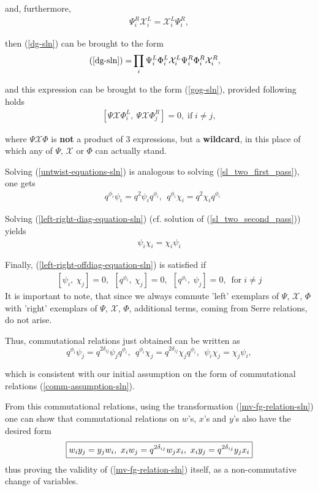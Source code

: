 \documentclass{article}
\newcommand{\lsb}{\left [}
\newcommand{\rsb}{\right ]}
\newcommand{\SB}[1]{\lsb #1 \rsb}
\newcommand{\be}{\begin{eqnarray}}
\newcommand{\ee}{\end{eqnarray}}
\DeclareMathOperator{\If}{if}
\DeclareMathOperator{\For}{for}
\newcommand {\?}{\textit{???}}
\def\Chi{\mathcal{X}}
\newcommand{\EChiL}[1][]{\Chi^L_{#1}}
\newcommand{\EChiR}[1][]{\Chi^R_{#1}}
\newcommand{\EPsiL}[1][]{\Psi^L_{#1}}
\newcommand{\EPsiR}[1][]{\Psi^R_{#1}}
\newcommand{\QPhiL}[1][]{\Phi^L_{#1}}
\newcommand{\QPhiR}[1][]{\Phi^R_{#1}}
\newcommand{\delabel}[1]{(\ref{#1})}
\begin{document}
and, furthermore,
\be
\label{left-right-diag-equation-sln}
\EPsiR[i] \EChiL[i] = \EChiL[i] \EPsiR[i],
\ee

then \delabel{dg-sln} can be brought to the form
\begin{align}
\delabel{dg-sln} = & \prod_i \EPsiL[i] \QPhiL[i] \EChiL[i] \EPsiR[i]  \QPhiR[i]  \EChiR[i],
\end{align}

and this expression can be brought to the form \delabel{gog-sln}, provided following holds
\be
\label{left-right-offdiag-equation-sln}
\SB{\Psi\Chi\Phi^L_i,\ \Psi\Chi\Phi^R_j} = 0, \If i \neq j,
\ee

where $\Psi\Chi\Phi$ is {\bf not} a product of 3 expressions, but a {\bf wildcard},
in this place of which any of $\Psi$, $\Chi$ or $\Phi$ can actually stand.

Solving \delabel{untwist-equations-sln} is analogous to solving \delabel{sl_two_first_pass},
one gets
\be
& q^{\phi_i} \psi_i = q^2 \psi_i q^{\phi_i},\ \ q^{\phi_i} \chi_i = q^2 \chi_i q^{\phi_i}
\ee

Solving \delabel{left-right-diag-equation-sln} (cf. solution of \delabel{sl_two_second_pass}) yields
\be
\psi_i \chi_i = \chi_i \psi_i
\ee

Finally, \delabel{left-right-offdiag-equation-sln} is satisfied if
\be
\SB{\psi_i,\ \chi_j} = 0,\ \ \SB{q^{\phi_i},\ \chi_j} = 0,\ \ \SB{q^{\phi_i},\ \psi_j} = 0,\ \For i \neq j
\ee
It is important to note, that since we always commute 'left' exemplars of $\Psi$, $\Chi$, $\Phi$ with
'right' exemplars of $\Psi$, $\Chi$, $\Phi$, additional terms, coming from Serre relations, do not arise.

Thus, commutational relations just obtained can be written as
\begin{equation}
\label{comm-relations-psichiphi-sln}
\boxed{
  q^{\phi_i} \psi_j = q^{2\delta_{ij}} \psi_j q^{\phi_i},\ \ 
  q^{\phi_i} \chi_j = q^{2\delta_{ij}} \chi_j q^{\phi_i},\ \ 
  \psi_i \chi_j = \chi_j \psi_i,
}
\end{equation}

which is consistent with our initial assumption on the form of commutational relations \delabel{comm-assumption-sln}.

From this commutational relations, using the transformation \delabel{mv-fg-relation-sln}
one can show that commutational relations on $w$'s, $x$'s and $y$'s also have the desired form
\begin{equation}
\boxed{
\label{comm-relations-wxy-sln}
w_i y_j = y_j w_i,\ x_i w_j = q^{2 \delta_{ij}} w_j x_i, \ x_i y_j = q^{2 \delta_{ij}} y_j x_i
}
\end{equation}
 thus proving the validity of \delabel{mv-fg-relation-sln} itself, as a non-commutative change of variables.
\end{document}
